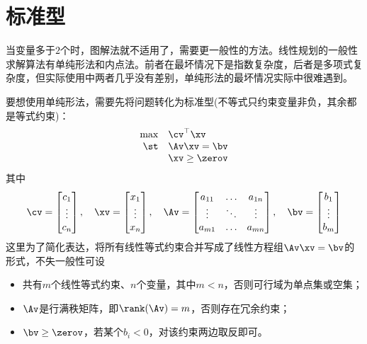 \documentclass{ctexart}
\begin{document}
\section{标准型}

当变量多于$2$个时，图解法就不适用了，需要更一般性的方法。线性规划的一般性求解算法有单纯形法和内点法。前者在最坏情况下是指数复杂度，后者是多项式复杂度，但实际使用中两者几乎没有差别，单纯形法的最坏情况实际中很难遇到。

要想使用单纯形法，需要先将问题转化为标准型(不等式只约束变量非负，其余都是等式约束)：
\begin{align*}
    \begin{array}{rl}
        \max & \cv^\top \xv   \\
        \st  & \Av \xv = \bv  \\
             & \xv \ge \zerov
    \end{array}
\end{align*}
其中
\begin{align*}
    \cv = \begin{bmatrix}
              c_1 \\ \vdots \\ c_n
          \end{bmatrix}, \quad
    \xv = \begin{bmatrix}
              x_1 \\ \vdots \\ x_n
          \end{bmatrix}, \quad
    \Av= \begin{bmatrix}
             a_{11} & \ldots & a_{1n} \\
             \vdots & \ddots & \vdots \\
             a_{m1} & \ldots & a_{mn}
         \end{bmatrix}, \quad
    \bv = \begin{bmatrix}
              b_1 \\ \vdots \\ b_m
          \end{bmatrix}
\end{align*}
这里为了简化表达，将所有线性等式约束合并写成了线性方程组$\Av \xv = \bv$的形式，不失一般性可设
\begin{itemize}
    \item 共有$m$个线性等式约束、$n$个变量，其中$m < n$，否则可行域为单点集或空集；
    \item $\Av$是行满秩矩阵，即$\rank(\Av) = m$，否则存在冗余约束；
    \item $\bv \ge \zerov$，若某个$b_i < 0$，对该约束两边取反即可。
\end{itemize}
\end{document}
